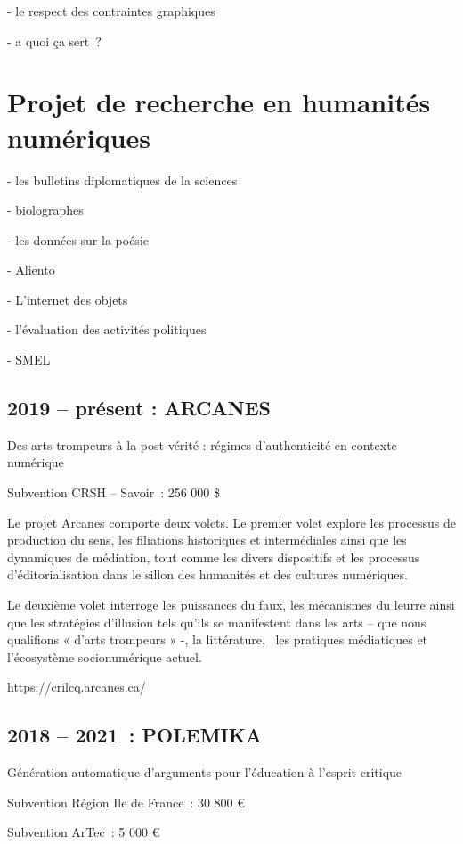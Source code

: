\documentclass[
  a4paper,
  DIV=11,
  numbers=noendperiod]{scrreprt}
\begin{document}
- le respect des contraintes graphiques

- a quoi ça sert~?

\section{Projet de recherche en humanités
numériques}\label{sec-projetsRecherche}

- les bulletins diplomatiques de la sciences

- biolographes

- les données sur la poésie

- Aliento

- L'internet des objets

- l'évaluation des activités politiques

- SMEL

\subsection{2019 -- présent : ARCANES}\label{sec-projetArcanes}

Des arts trompeurs à la post-vérité : régimes d'authenticité en contexte
numérique

Subvention CRSH -- Savoir~: 256 000 \$

Le projet Arcanes comporte deux volets. Le premier volet explore les
processus de production du sens, les filiations historiques et
intermédiales ainsi que les dynamiques de médiation, tout comme les
divers dispositifs et les processus d'éditorialisation dans le sillon
des humanités et des cultures numériques.

Le deuxième volet interroge les puissances du faux, les mécanismes du
leurre ainsi que les stratégies d'illusion tels qu'ils se manifestent
dans les arts -- que nous qualifions « d'arts trompeurs » -, la
littérature,~ les pratiques médiatiques et l'écosystème socionumérique
actuel.

https://crilcq.arcanes.ca/~

\subsection{2018 -- 2021~: POLEMIKA}\label{sec-projetPolemika}

Génération automatique d'arguments pour l'éducation à l'esprit critique

Subvention Région Ile de France~: 30 800 €~

Subvention ArTec~: 5 000 €
\end{document}
